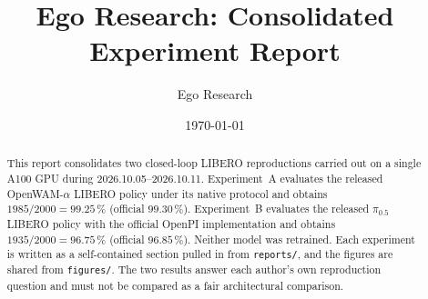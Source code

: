\documentclass[11pt, a4paper]{article}
\title{Ego Research: Consolidated Experiment Report}
\author{Ego Research}
\date{\today}
\begin{document}
\maketitle

\begin{abstract}
  This report consolidates two closed-loop LIBERO reproductions carried out on a
  single A100 GPU during 2026.10.05--2026.10.11. Experiment~A evaluates the
  released OpenWAM-$\alpha$ LIBERO policy under its native protocol and obtains
  $1985/2000 = 99.25\,\%$ (official $99.30\,\%$). Experiment~B evaluates the
  released $\pi_{0.5}$ LIBERO policy with the official OpenPI implementation and
  obtains $1935/2000 = 96.75\,\%$ (official $96.85\,\%$). Neither model was
  retrained. Each experiment is written as a self-contained section pulled in
  from \texttt{reports/}, and the figures are
  shared from \texttt{figures/}. The two results answer each author's own
  reproduction question and must not be compared as a fair architectural
  comparison.
\end{abstract}

\tableofcontents
\newpage






\end{document}
